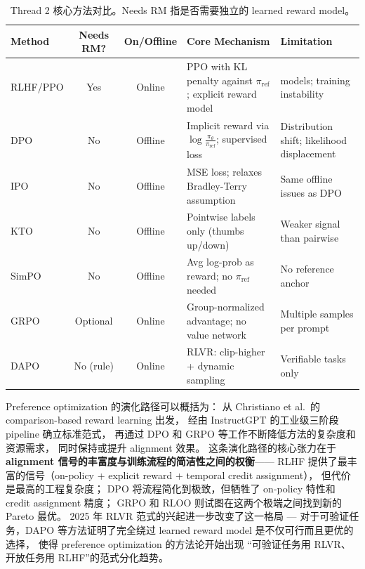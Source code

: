 \begin{table}[!ht]
\centering
\caption{Thread 2 核心方法对比。Needs RM 指是否需要独立的 learned reward model。}
\label{tab:pref-comparison}
\small
\begin{tabularx}{\textwidth}{l c c >{\raggedright\arraybackslash}X >{\raggedright\arraybackslash}X}
\toprule
\textbf{Method} & \textbf{Needs RM?} & \textbf{On/Offline} & \textbf{Core Mechanism} & \textbf{Limitation} \\
\midrule
RLHF/PPO & Yes & Online & PPO with KL penalty against $\pi_{\text{ref}}$; explicit reward model & 4 models; training instability \\
DPO & No & Offline & Implicit reward via $\log \frac{\pi_\theta}{\pi_{\text{ref}}}$; supervised loss & Distribution shift; likelihood displacement \\
IPO & No & Offline & MSE loss; relaxes Bradley-Terry assumption & Same offline issues as DPO \\
KTO & No & Offline & Pointwise labels only (thumbs up/down) & Weaker signal than pairwise \\
SimPO & No & Offline & Avg log-prob as reward; no $\pi_{\text{ref}}$ needed & No reference anchor \\
GRPO & Optional & Online & Group-normalized advantage; no value network & Multiple samples per prompt \\
DAPO & No (rule) & Online & RLVR: clip-higher + dynamic sampling & Verifiable tasks only \\
\bottomrule
\end{tabularx}
\end{table}

Preference optimization 的演化路径可以概括为：
从 Christiano et al.\ 的 comparison-based reward learning 出发，
经由 InstructGPT 的工业级三阶段 pipeline 确立标准范式，
再通过 DPO 和 GRPO 等工作不断降低方法的复杂度和资源需求，
同时保持或提升 alignment 效果。
这条演化路径的核心张力在于
\textbf{alignment 信号的丰富度与训练流程的简洁性之间的权衡}——
RLHF 提供了最丰富的信号（on-policy + explicit reward + temporal credit assignment），
但代价是最高的工程复杂度；
DPO 将流程简化到极致，但牺牲了 on-policy 特性和 credit assignment 精度；
GRPO 和 RLOO 则试图在这两个极端之间找到新的 Pareto 最优。
2025 年 RLVR 范式的兴起进一步改变了这一格局 ---
对于可验证任务，DAPO 等方法证明了完全绕过 learned reward model
是不仅可行而且更优的选择，
使得 preference optimization 的方法论开始出现
``可验证任务用 RLVR、开放任务用 RLHF''的范式分化趋势。
